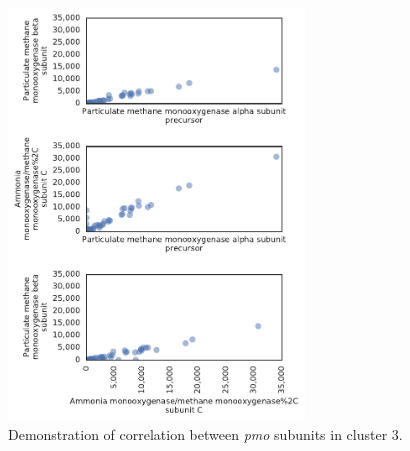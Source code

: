 \begin{figure}[H]
\centering
    \includegraphics[width=0.7\textwidth]{./tex/chapter3/figures/170402_correlations_between_pMMO_subunits--set3.pdf}
    \begin{singlespace}
    \caption[Demonstration of correlation between \textit{pmo} subniuts in cluster 3]{
        Demonstration of correlation between \textit{pmo} subunits in cluster 3.}
    \label{fig:pmo_cor3}
    \end{singlespace}
\end{figure}


